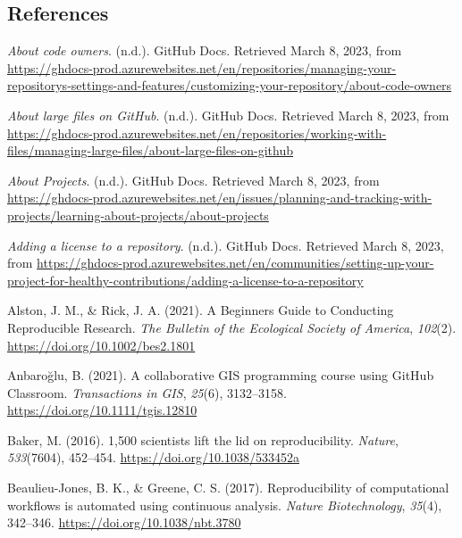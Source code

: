 \hypertarget{references}{%
\subsection{References}\label{references}}

\hypertarget{refs}{}
\begin{CSLReferences}{1}{0}
\leavevmode{}%
\emph{About code owners}. (n.d.). GitHub Docs. Retrieved March 8, 2023, from \url{https://ghdocs-prod.azurewebsites.net/en/repositories/managing-your-repositorys-settings-and-features/customizing-your-repository/about-code-owners}

\leavevmode{}%
\emph{About large files on GitHub}. (n.d.). GitHub Docs. Retrieved March 8, 2023, from \url{https://ghdocs-prod.azurewebsites.net/en/repositories/working-with-files/managing-large-files/about-large-files-on-github}

\leavevmode{}%
\emph{About Projects}. (n.d.). GitHub Docs. Retrieved March 8, 2023, from \url{https://ghdocs-prod.azurewebsites.net/en/issues/planning-and-tracking-with-projects/learning-about-projects/about-projects}

\leavevmode{}%
\emph{Adding a license to a repository}. (n.d.). GitHub Docs. Retrieved March 8, 2023, from \url{https://ghdocs-prod.azurewebsites.net/en/communities/setting-up-your-project-for-healthy-contributions/adding-a-license-to-a-repository}

\leavevmode{}%
Alston, J. M., \& Rick, J. A. (2021). A Beginner\textquotesingle s Guide to Conducting Reproducible Research. \emph{The Bulletin of the Ecological Society of America}, \emph{102}(2). \url{https://doi.org/10.1002/bes2.1801}

\leavevmode{}%
Anbaroğlu, B. (2021). A collaborative GIS programming course using GitHub Classroom. \emph{Transactions in GIS}, \emph{25}(6), 3132--3158. \url{https://doi.org/10.1111/tgis.12810}

\leavevmode{}%
Baker, M. (2016). 1,500 scientists lift the lid on reproducibility. \emph{Nature}, \emph{533}(7604), 452--454. \url{https://doi.org/10.1038/533452a}

\leavevmode{}%
Beaulieu-Jones, B. K., \& Greene, C. S. (2017). Reproducibility of computational workflows is automated using continuous analysis. \emph{Nature Biotechnology}, \emph{35}(4), 342--346. \url{https://doi.org/10.1038/nbt.3780}


\end{CSLReferences}

